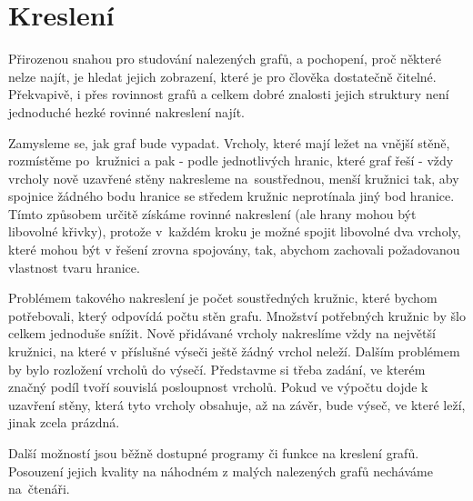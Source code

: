 
\chapter{Kreslení} \label{kresleni}

Přirozenou snahou pro studování nalezených grafů, a pochopení, proč některé nelze najít, je hledat jejich zobrazení, které je pro člověka dostatečně čitelné. Překvapivě, i přes rovinnost grafů a celkem dobré znalosti jejich struktury není jednoduché hezké rovinné nakreslení najít.

Zamysleme se, jak graf bude vypadat. Vrcholy, které mají ležet na vnější stěně, rozmístěme po~kružnici a pak - podle jednotlivých hranic, které graf řeší - vždy vrcholy nově uzavřené stěny nakresleme na~soustřednou, menší kružnici tak, aby spojnice žádného bodu hranice se středem kružnic neprotínala jiný bod hranice. Tímto způsobem určitě získáme rovinné nakreslení (ale hrany mohou být libovolné křivky), protože v~každém kroku je možné spojit libovolné dva vrcholy, které mohou být v řešení zrovna spojovány, tak, abychom zachovali požadovanou vlastnost tvaru hranice.

Problémem takového nakreslení je počet soustředných kružnic, které bychom potřebovali, který odpovídá počtu stěn grafu. Množství potřebných kružnic by šlo celkem jednoduše snížit. Nově přidávané vrcholy nakreslíme vždy na největší kružnici, na které v příslušné výseči ještě žádný vrchol neleží. Dalším problémem by bylo rozložení vrcholů do výsečí. Představme si třeba zadání, ve kterém značný podíl tvoří souvislá posloupnost  vrcholů. Pokud ve výpočtu dojde k uzavření stěny, která tyto vrcholy obsahuje, až na závěr, bude výseč, ve které leží, jinak zcela prázdná.

Další možností jsou běžně dostupné programy či funkce na kreslení grafů. Posouzení jejich kvality na náhodném z malých nalezených grafů necháváme na~čtenáři.



